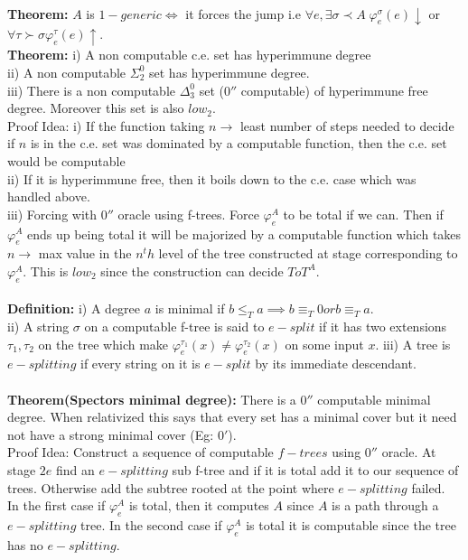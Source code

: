\documentclass{article}
\begin{document}
  \\
  \textbf{Theorem:} $A$ is $1-generic \iff $ it forces the jump i.e $\forall e, \exists \sigma \prec A \; \varphi_e^\sigma (e)\downarrow $ or $\forall \tau \succ \sigma \varphi_e^\tau(e)\uparrow$.
  \\
  \textbf{Theorem:} i) A non computable c.e. set has hyperimmune degree\\
  ii) A non computable $\Sigma^0_2$ set has hyperimmune degree.\\
  iii) There is a non computable $\Delta^0_3$ set ($0''$ computable) of hyperimmune free degree. Moreover this set is also $low_2$.\\
  Proof Idea: i) If the function taking $n \to $ least number of steps needed to decide if $n$ is in the c.e. set was dominated by a computable function, then the c.e. set would be computable\\
  ii) If it is hyperimmune free, then it boils down to the c.e. case which was handled above.\\
  iii) Forcing with $0''$ oracle using f-trees. Force $\varphi_e^A$ to be total if we can. Then if $\varphi_e^A$ ends up being total it will be majorized by a computable function which takes $n \to $ max value in the $n^th $ level of the tree constructed at stage corresponding to $\varphi_e^A$. This is $low_2$ since the construction can decide $ToT^A$.
   \\
   \\
   \textbf{Definition:} i) A degree $a$ is minimal if $b\leq_T a \implies b \equiv_T 0 or b \equiv_T a$.\\
   ii) A string $\sigma$ on a computable f-tree is said to $e-split $ if it  has two extensions $\tau_1,\tau_2$ on the tree which make $\varphi^{\tau_1}_e(x) \neq \varphi^{\tau_2}_e(x)$ on some input $x$.
   iii) A tree is $e-splitting$ if every string on it is $e-split$ by its immediate descendant. \\
   \\
   \textbf{Theorem(Spectors minimal degree):} There is a $0''$ computable minimal degree. When relativized this says that every set has a minimal cover but it need not have a strong minimal cover (Eg: $0'$).\\
   Proof Idea: Construct a sequence of computable $f-trees$ using $0''$ oracle. At stage $2e$ find an $e-splitting$ sub f-tree and if it is total add it to our sequence of trees. Otherwise add the subtree rooted at the point where $e-splitting$ failed. \\
   In the first case if $\varphi_e^A$ is total, then it computes $A$ since $A$  is a path through a $e-splitting$ tree. In the second case if $\varphi_e^A$ is total it is computable since the tree has no $e-splitting$.\\
\end{document}
